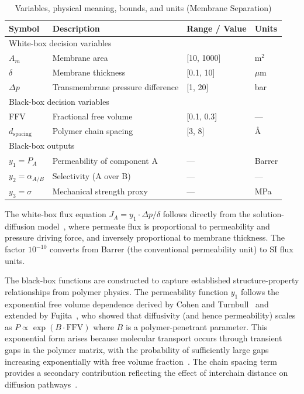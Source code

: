 \documentclass[12pt,a4paper]{article}%
\theoremstyle{plain}%
\theoremstyle{remark}%
\theoremstyle{definition}%
\begin{document}
\begin{appendices}
\begin{table}[htbp]
\centering
\caption{Variables, physical meaning, bounds, and units (Membrane Separation)}
\label{tab:membrane_vars}
\begin{tabular}{@{}llll@{}}
\toprule
\textbf{Symbol} & \textbf{Description} & \textbf{Range / Value} & \textbf{Units} \\
\midrule
\multicolumn{4}{l}{White-box decision variables} \\
\midrule
$A_m$ & Membrane area & [10, 1000] & m$^2$ \\
$\delta$ & Membrane thickness & [0.1, 10] & $\mu$m \\
$\Delta p$ & Transmembrane pressure difference & [1, 20] & bar \\
\midrule
\multicolumn{4}{l}{Black-box decision variables} \\
\midrule
FFV & Fractional free volume & [0.1, 0.3] & --- \\
$d_{\text{spacing}}$ & Polymer chain spacing & [3, 8] & \AA \\
\midrule
\multicolumn{4}{l}{Black-box outputs} \\
\midrule
$y_1 = P_A$ & Permeability of component A & --- & Barrer \\
$y_2 = \alpha_{A/B}$ & Selectivity (A over B) & --- & --- \\
$y_3 = \sigma$ & Mechanical strength proxy & --- & MPa \\
\bottomrule
\end{tabular}
\end{table}

The white-box flux equation $J_A = y_1 \cdot \Delta p / \delta$ follows directly from the solution-diffusion model~\cite{wijmans1995solution}, where permeate flux is proportional to permeability and pressure driving force, and inversely proportional to membrane thickness. The factor $10^{-10}$ converts from Barrer (the conventional permeability unit) to SI flux units.

The black-box functions are constructed to capture established structure-property relationships from polymer physics. The permeability function $y_1$ follows the exponential free volume dependence derived by Cohen and Turnbull~\cite{cohen1959molecular} and extended by Fujita~\cite{fujita1961diffusion}, who showed that diffusivity (and hence permeability) scales as $P \propto \exp(B \cdot \text{FFV})$ where $B$ is a polymer-penetrant parameter. This exponential form arises because molecular transport occurs through transient gaps in the polymer matrix, with the probability of sufficiently large gaps increasing exponentially with free volume fraction~\cite{matteucci2006transport}. The chain spacing term provides a secondary contribution reflecting the effect of interchain distance on diffusion pathways~\cite{lee1980selection}.


\end{appendices}
\end{document}
